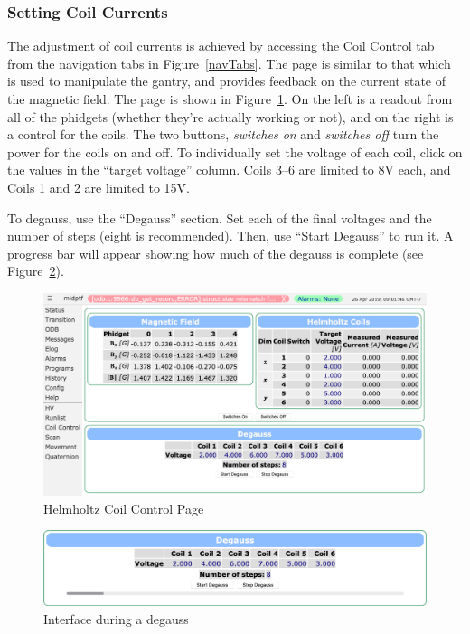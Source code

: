\documentclass[twoside,letterpaper]{refart}
\begin{document}
\subsubsection{Setting Coil Currents}\label{setCoils}

The adjustment of coil currents is achieved by accessing the Coil Control tab from the navigation tabs in Figure~\ref{navTabs}. The page is similar to that which is used to manipulate the gantry, and provides feedback on the current state of the magnetic field. The page is shown in Figure~\ref{fig:helmCoil}. On the left is a readout from all of the phidgets (whether they're actually working or not), and on the right is a control for the coils. The two buttons, \emph{switches on} and \emph{switches off} turn the power for the coils on and off. To individually set the voltage of each coil, click on the values in the ``target voltage'' column. Coils 3--6 are limited to 8V each, and Coils 1 and 2 are limited to 15V.

To degauss, use the ``Degauss'' section. Set each of the final voltages and the number of steps (eight is recommended). Then, use ``Start Degauss'' to run it. A progress bar will appear showing how much of the degauss is complete (see Figure~\ref{fig:helmCoilDegauss}).

\FloatBarrier

\begin{figure}[!htpb]\centering	
	\includegraphics[width=\textwidth]{images/helmCoil}
	\caption{Helmholtz Coil Control Page\label{fig:helmCoil}}
\end{figure}

\begin{figure}[!htpb]\centering
	\includegraphics[width=\textwidth]{images/helmCoilDegaussing}
	\caption{Interface during a degauss\label{fig:helmCoilDegauss}}
\end{figure}
\end{document}

